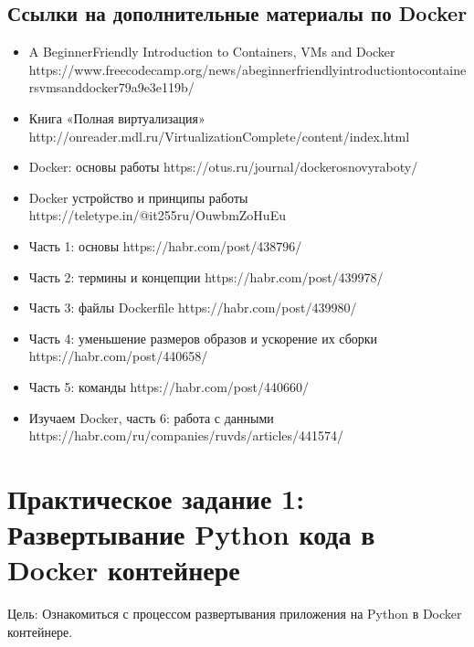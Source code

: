 \documentclass[letterpaper,10pt,russian]{sphinxmanual}
\begin{document}
\subsection{Ссылки на дополнительные материалы по Docker}
\label{\detokenize{educational_materials/docker_base/content:id13}}\begin{itemize}
\item {} 
\sphinxAtStartPar
A Beginner\sphinxhyphen{}Friendly Introduction to Containers, VMs and Docker https://www.freecodecamp.org/news/a\sphinxhyphen{}beginner\sphinxhyphen{}friendly\sphinxhyphen{}introduction\sphinxhyphen{}to\sphinxhyphen{}containers\sphinxhyphen{}vms\sphinxhyphen{}and\sphinxhyphen{}docker\sphinxhyphen{}79a9e3e119b/

\item {} 
\sphinxAtStartPar
Книга «Полная виртуализация» http://onreader.mdl.ru/VirtualizationComplete/content/index.html

\item {} 
\sphinxAtStartPar
Docker: основы работы https://otus.ru/journal/docker\sphinxhyphen{}osnovy\sphinxhyphen{}raboty/

\item {} 
\sphinxAtStartPar
Docker \sphinxhyphen{} устройство и принципы работы https://teletype.in/@it255ru/OuwbmZoHuEu

\item {} 
\sphinxAtStartPar
Часть 1: основы https://habr.com/post/438796/

\item {} 
\sphinxAtStartPar
Часть 2: термины и концепции https://habr.com/post/439978/

\item {} 
\sphinxAtStartPar
Часть 3: файлы Dockerfile https://habr.com/post/439980/

\item {} 
\sphinxAtStartPar
Часть 4: уменьшение размеров образов и ускорение их сборки https://habr.com/post/440658/

\item {} 
\sphinxAtStartPar
Часть 5: команды https://habr.com/post/440660/

\item {} 
\sphinxAtStartPar
Изучаем Docker, часть 6: работа с данными https://habr.com/ru/companies/ruvds/articles/441574/

\end{itemize}

\sphinxstepscope


\section{Практическое задание 1: Развертывание Python кода в Docker контейнере}
\label{\detokenize{educational_materials/docker_base/exercises:python-docker}}\label{\detokenize{educational_materials/docker_base/exercises::doc}}
\sphinxAtStartPar
Цель: Ознакомиться с процессом развертывания приложения на Python в Docker контейнере.
\end{document}
